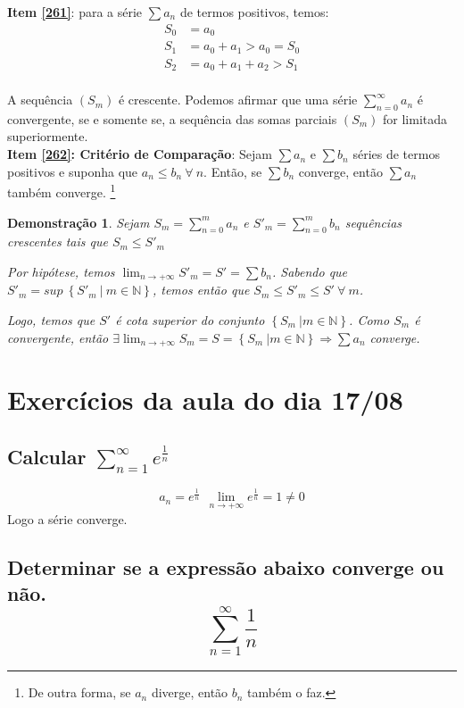 \documentclass[12pt,openany]{book}
\newtheorem{demonstration}{Demonstração}
\begin{document}
\textbf{Item \ref{261}}: para a série $\sum a_n$ de termos positivos, temos:
\begin{align*}
S_0 &= a_0 \\
S_1 &= a_0 + a_1 > a_0 = S_0 \\
S_2 &= a_0 + a_1 + a_2 > S_1 \\
\end{align*}

A sequência $(S_m)$ é crescente. Podemos afirmar que uma série $\displaystyle{\sum_{n=0}^{\infty} a_n}$ é convergente, se e somente se, a sequência das somas parciais $(S_m)$ for limitada superiormente. \\

\textbf{Item \ref{262}: Critério de Comparação}: Sejam $\sum a_n$ e $\sum b_n$ séries de termos positivos e suponha que $a_n \leq b_n \ \forall \ n$. Então, se $\sum b_n$ converge, então $\sum a_n$ também converge. \footnote{De outra forma, se $a_n$ diverge, então $b_n$ também o faz.}

\begin{demonstration}
Sejam $\displaystyle{S_m = \sum_{n=0}^{m} a_n}$ e  $\displaystyle{S'_m = \sum_{n=0}^{m} b_n}$ sequências  crescentes tais que $S_m \leq S'_m$

Por hipótese, temos $\displaystyle{\lim_{n \rightarrow +\infty} S'_m = S' = \sum b_n}$. Sabendo que $S'_m = sup \ \left\{S'_m \ | \ m \in \mathds{N}\right\}$, temos então que $S_m \leq S'_m \leq S' \ \forall \ m$.

Logo, temos que $S'$ é cota superior do conjunto $\left\{S_m \ | m \in \mathds{N}\right\}$. Como $S_m$ é convergente, então $\displaystyle{\exists \lim_{n \rightarrow + \infty} S_m = S = \left\{S_m \ | m \in \mathds{N}\right\} \Rightarrow \sum a_n}$ converge. 
\end{demonstration}

\section{Exercícios da aula do dia 17/08}
\label{sec:s27}

\subsection*{Calcular $\displaystyle{\sum_{n=1}^{\infty} e^{\frac{1}{n}}} $}
$$ a_n = e^{\frac{1}{n}} \ \ \lim_{n \rightarrow +\infty} e^{\frac{1}{n}} = 1 \neq 0$$ Logo a série converge.

\subsection*{Determinar se a expressão abaixo converge ou não. $$\sum_{n=1}^{\infty} \frac{1}{n}$$}
\end{document}

